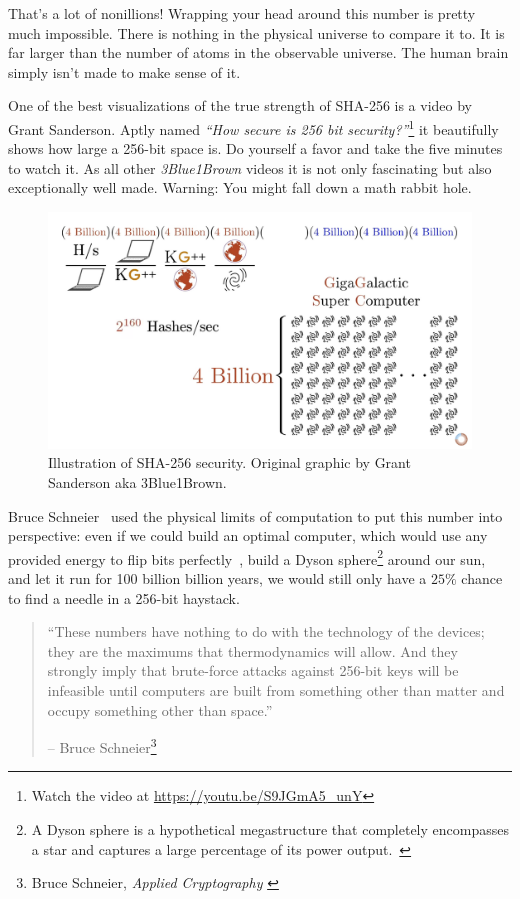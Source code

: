 That's a lot of nonillions! Wrapping your head around this number is
pretty much impossible. There is nothing in the physical universe to
compare it to. It is far larger than the number of atoms in the
observable universe. The human brain simply isn't made to make sense of
it.

\newpage

One of the best visualizations of the true strength of SHA-256 is a video by
Grant Sanderson. Aptly named \textit{\enquote{How secure is 256 bit
security?}}\footnote{Watch the video at \url{https://youtu.be/S9JGmA5_unY}} it
beautifully shows how large a 256-bit space is. Do yourself a favor and take the
five minutes to watch it. As all other \textit{3Blue1Brown} videos it is not
only fascinating but also exceptionally well made. Warning: You might fall down
a math rabbit hole.

\begin{figure}
  \includegraphics{assets/images/youtube-vid-inverted.png}
  \caption{Illustration of SHA-256 security. Original graphic by Grant Sanderson aka 3Blue1Brown.}
  \label{fig:youtube-vid-inverted}
\end{figure}

Bruce Schneier~\cite{web:schneier} used the physical limits of computation to put this
number into perspective: even if we could build an optimal computer,
which would use any provided energy to flip bits perfectly~\cite{wiki:landauer}, build a
Dyson sphere\footnote{A Dyson sphere is a hypothetical megastructure that completely encompasses a star and captures a large percentage of its power output.~\cite{wiki:dyson}} around our sun, and let it run for 100 billion billion
years, we would still only have a $25\%$ chance to find a needle in a
256-bit haystack.

\begin{quotation}\begin{samepage}
\enquote{These numbers have nothing to do with the technology of the devices;
they are the maximums that thermodynamics will allow. And they
strongly imply that brute-force attacks against 256-bit keys will be
infeasible until computers are built from something other than matter
and occupy something other than space.}
\begin{flushright} -- Bruce Schneier\footnote{Bruce Schneier, \textit{Applied Cryptography} \cite{bruce-schneier}}
\end{flushright}\end{samepage}\end{quotation}


